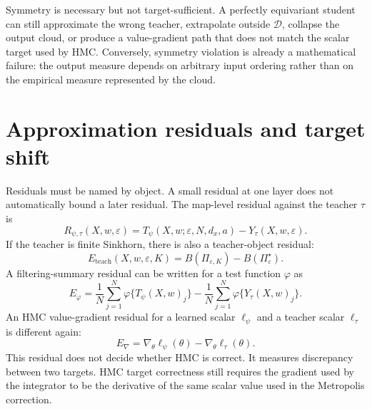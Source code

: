 Symmetry is necessary but not target-sufficient.  A perfectly equivariant
student can still approximate the wrong teacher, extrapolate outside
$\mathcal D$, collapse the output cloud, or produce a value-gradient path that
does not match the scalar target used by HMC.  Conversely, symmetry violation is
already a mathematical failure: the output measure depends on arbitrary input
ordering rather than on the empirical measure represented by the cloud.

\section{Approximation residuals and target shift}
\label{sec:bf-learned-ot-residuals}

Residuals must be named by object.  A small residual at one layer does not
automatically bound a later residual.  The map-level residual against the
teacher $\tau$ is
\begin{equation}
\label{eq:bf-learned-ot-residual}
  R_{\psi,\tau}(X,w,\varepsilon)
  =
  T_\psi(X,w;\varepsilon,N,d_x,a)-Y_\tau(X,w,\varepsilon).
\end{equation}
If the teacher is finite Sinkhorn, there is also a teacher-object residual:
\begin{equation}
\label{eq:bf-learned-ot-teacher-object-residual}
  E_{\mathrm{teach}}(X,w,\varepsilon,K)
  =
  B(\Pi_{\varepsilon,K})-B(\Pi_\varepsilon^\star).
\end{equation}
A filtering-summary residual can be written for a test function $\varphi$ as
\begin{equation}
\label{eq:bf-learned-ot-filtering-summary-residual}
  E_\varphi
  =
  \frac{1}{N}\sum_{j=1}^N \varphi\{T_\psi(X,w)_j\}
  -
  \frac{1}{N}\sum_{j=1}^N \varphi\{Y_\tau(X,w)_j\}.
\end{equation}
An HMC value-gradient residual for a learned scalar $\ell_\psi$ and a teacher
scalar $\ell_\tau$ is different again:
\begin{equation}
\label{eq:bf-learned-ot-hmc-gradient-residual}
  E_{\nabla}
  =
  \nabla_\theta \ell_\psi(\theta)-\nabla_\theta \ell_\tau(\theta).
\end{equation}
This residual does not decide whether HMC is correct.  It measures discrepancy
between two targets.  HMC target correctness still requires the gradient used by
the integrator to be the derivative of the same scalar value used in the
Metropolis correction.

